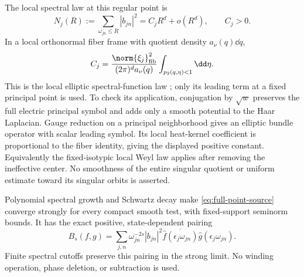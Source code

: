The local spectral law at this regular point is
\begin{equation}\label{eq:point-weyl}
N_j(R):=\sum_{\omega_{jn}\le R}|b_{jn}|^2
=C_jR^d+o(R^d),\qquad C_j>0.
\end{equation}
In a local orthonormal fiber frame with quotient density
$a_\nu(q)\dd q$,
\begin{equation}
C_j=\frac{\norm{\xi_j}_{\rm fib}^2}{(2\pi)^d a_\nu(q)}
\int_{p_2(q,\eta)<1}\dd\eta.
\end{equation}
This is the local elliptic spectral-function law
\cite{hormander-spectral,ramacher}; only its leading term at a
fixed principal point is used. To check its application, conjugation
by $\sqrt w$ preserves the full electric principal symbol and adds
only a smooth potential to the Haar Laplacian. Gauge reduction on a
principal neighborhood gives an elliptic bundle operator with scalar
leading symbol. Its local heat-kernel coefficient is proportional
to the fiber identity, giving the displayed positive constant.
Equivalently the fixed-isotypic local Weyl law applies after removing
the ineffective center. No smoothness of the entire singular quotient
or uniform estimate toward its singular orbits is asserted.

Polynomial spectral growth and Schwartz decay make
\eqref{eq:full-point-source} converge strongly for every compact
smooth test, with fixed-support seminorm bounds. It has the exact
positive, state-dependent pairing
\begin{equation}\label{eq:full-point-pairing}
B_s(f,g)=\sum_{j,n}\omega_{jn}^{-2s}|b_{jn}|^2
\overline{\widehat f(\epsilon_j\omega_{jn})}
\widehat g(\epsilon_j\omega_{jn}).
\end{equation}
Finite spectral cutoffs preserve this pairing in the strong limit.
No winding operation, phase deletion, or subtraction is used.

